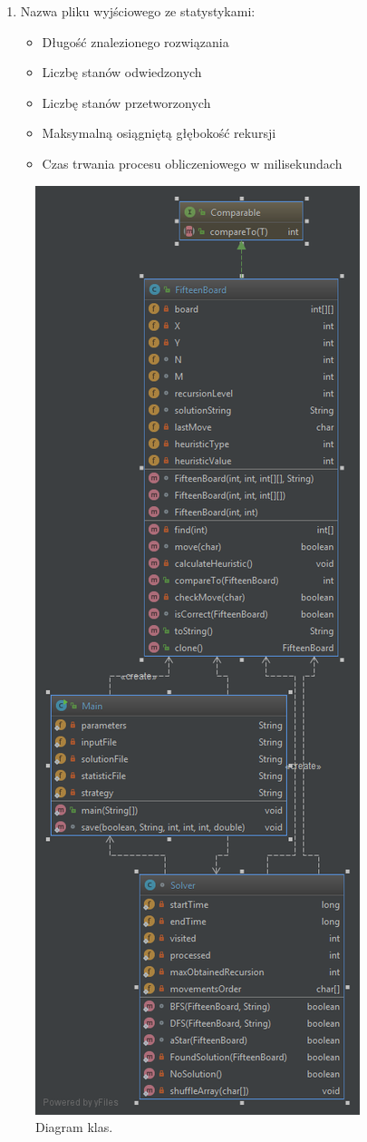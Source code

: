\documentclass{classrep}
\begin{document}
\begin{enumerate}
	\item Nazwa pliku wyjściowego ze statystykami:
	\begin{itemize}
		\item Długość znalezionego rozwiązania
		\item Liczbę stanów odwiedzonych
		\item Liczbę stanów przetworzonych
		\item Maksymalną osiągniętą głębokość rekursji
		\item Czas trwania procesu obliczeniowego w milisekundach
	\end{itemize}
\end{enumerate}


\begin{figure}[H]
\centering
	\includegraphics[height=1\textheight]{UML.png}
\caption{Diagram klas.}
\end{figure}
\end{document}
